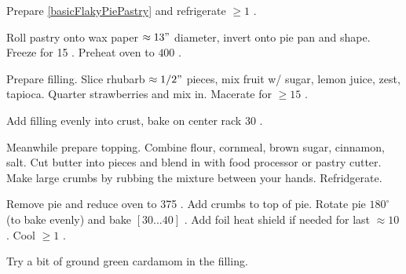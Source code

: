 \begin{preparation}
\item Prepare \ref{basicFlakyPiePastry}  and refrigerate $\geq 1$ \hour.

\item Roll pastry onto wax paper $\approx 13"$ diameter, invert onto pie pan and shape.
	Freeze for 15 \minute.
	Preheat oven to $400$ \Fahrenheit.

\item Prepare filling.
	Slice rhubarb $\approx 1/2"$ pieces, mix fruit w/ sugar, lemon juice, zest, tapioca.
	Quarter strawberries and mix in.
	Macerate for $\geq 15$ \minute.

\item Add filling evenly into crust, bake on center rack 30 \minute.

\item Meanwhile prepare topping.
	Combine flour, cornmeal, brown sugar, cinnamon, salt.
	Cut butter into pieces and blend in with food processor or pastry cutter.
	Make large crumbs by rubbing the mixture between your hands.
	Refridgerate.

\item Remove pie and reduce oven to 375 \Fahrenheit.
	Add crumbs to top of pie.
	Rotate pie $180^\circ$ (to bake evenly) and bake $[30...40]$ \minute.
	Add foil heat shield if needed for last $\approx 10$ \minute.
	Cool $\geq 1$ \hour.
\end{preparation}


\begin{variation}
\item Try a bit of ground green cardamom in the filling.
\end{variation}


\recipeend
